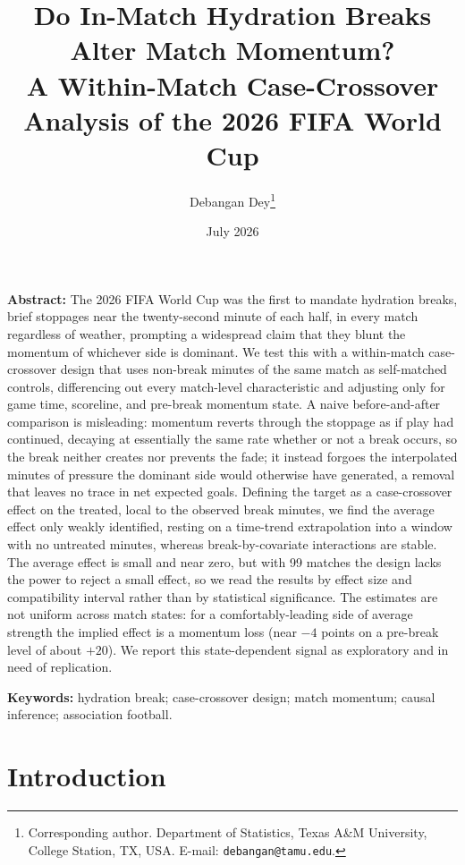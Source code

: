 \documentclass[11pt]{article}
\title{\bfseries Do In-Match Hydration Breaks Alter Match Momentum?\\
A Within-Match Case-Crossover Analysis of the 2026 FIFA World Cup}
\author[ ]{Debangan Dey\thanks{Corresponding author. Department of Statistics, Texas A\&M University,
College Station, TX, USA. E-mail: \texttt{debangan@tamu.edu}.}}
\affil[ ]{\small Department of Statistics, Texas A\&M University, College Station, TX, USA}
\date{July 2026}
\begin{document}
\maketitle

\noindent\textbf{Abstract:} The 2026 FIFA World Cup was the first to mandate hydration breaks, brief stoppages
near the twenty-second minute of each half, in every match regardless of weather, prompting a widespread claim
that they blunt the momentum of whichever side is dominant. We test this with a within-match case-crossover
design that uses non-break minutes of the same match as self-matched controls, differencing out every
match-level characteristic and adjusting only for game time, scoreline, and pre-break momentum state. A naive
before-and-after comparison is misleading: momentum reverts through the stoppage as if play had continued,
decaying at essentially the same rate whether or not a break occurs, so the break neither creates nor prevents
the fade; it instead forgoes the interpolated minutes of pressure the dominant side would otherwise have
generated, a removal that leaves no trace in net expected goals. Defining the target as a case-crossover effect on the treated,
local to the observed break minutes, we find the average effect only weakly identified, resting on a time-trend
extrapolation into a window with no untreated minutes, whereas break-by-covariate interactions are stable. The
average effect is small and near zero, but with 99 matches the design lacks the power to reject a small effect,
so we read the results by effect size and compatibility interval rather than by statistical significance. The
estimates are not uniform across match states: for a comfortably-leading side of average strength the implied
effect is a momentum loss (near $-4$ points on a pre-break level of about $+20$). We report this state-dependent signal as
exploratory and in need of replication.

\smallskip
\noindent\textbf{Keywords:} hydration break; case-crossover design; match momentum; causal inference;
association football.
\bigskip

\section{Introduction}
\end{document}
